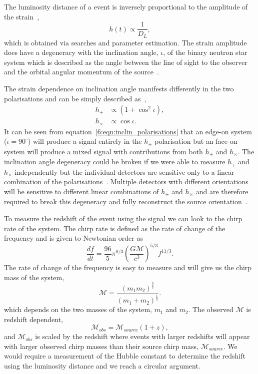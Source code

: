 The luminosity distance of a \gwadj event is inversely proportional to the amplitude of the \gwadj strain~\cite{Schutz:1986},%
\begin{equation}
    h(t) \propto \frac{1}{D_{L}} , 
\end{equation}
%
which is obtained via \gwadj searches and parameter estimation. The \gwadj strain amplitude does have a degeneracy with the inclination angle, $\iota$, of the binary neutron star system which is described as the angle between the line of sight to the observer and the orbital angular momentum of the source~\cite{inclin_degen_2:2019}.

The \gwadj strain dependence on inclination angle manifests differently in the two \gwadj polarisations and can be simply described as~\cite{inclin_degen:2018},
%
\begin{align}
    h_{+} &\propto \left(1+\cos^{2}\iota\right), \\
    h_{\times} &\propto \cos\iota .
    \label{6:eqn:inclin_polarisations}
\end{align}
%
It can be seen from equation~\ref{6:eqn:inclin_polarisations} that an edge-on system ($\iota = 90^{\circ}$) will produce a signal entirely in the $h_{+}$ polarisation but an face-on system will produce a mixed signal with contributions from both $h_{+}$ and $h_{\times}$. The inclination angle degeneracy could be broken if we were able to measure $h_{+}$ and $h_{\times}$ independently but the individual \gwadj detectors are sensitive only to a linear combination of the polarisations~\cite{aLIGO:2015}. Multiple \gwadj detectors with different orientations will be sensitive to different linear combinations of $h_{+}$ and $h_{\times}$ and are therefore required to break this degeneracy and fully reconstruct the source orientation~\cite{inclin_degen_2:2019}.

To measure the redshift of the event using the \gwadj signal we can look to the chirp rate of the system. The chirp rate is defined as the rate of change of the \gwadj frequency and is given to Newtonian order as~\cite{Jaranowski:2009}
%
\begin{equation}
    \frac{df}{dt} = \frac{96}{5} \pi^{8/3} \left(\frac{G\mathcal{M}}{c^{3}}\right)^{5/3} f^{11/3}.
    \label{6:eq:chirp_rate}
\end{equation}
%
The rate of change of the \gwadj frequency is easy to measure and will give us the chirp mass of the system,
%
\begin{equation}
    \mathcal{M} = \frac{(m_1 m_2)^{\frac{3}{5}}}{(m_1 + m_2)^{\frac{1}{5}}}.
    \label{6:eq:mchirp}
\end{equation}
%
which depends on the two masses of the system, $m_{1}$ and $m_{2}$. The observed $\mathcal{M}$ is redshift dependent,
%
\begin{equation}
    \mathcal{M}_{obs} = \mathcal{M}_{source}(1 + z), 
    \label{6:eq:mchirp_obs}
\end{equation}
and $\mathcal{M}_{obs}$ is scaled by the redshift where events with larger redshifts will appear with larger observed chirp masses than their source chirp mass, $\mathcal{M}_{source}$. We would require a measurement of the Hubble constant to determine the redshift using the luminosity distance and we reach a circular argument.

